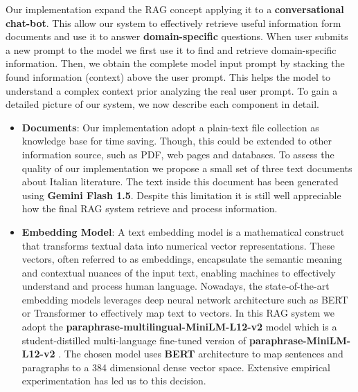 \documentclass{article}
\begin{document}
	Our implementation expand the RAG concept applying it to a \textbf{conversational chat-bot}. This allow our system to effectively retrieve useful information form documents and use it to answer \textbf{domain-specific} questions. 
	When user submits a new prompt to the model we first use it to find and retrieve domain-specific information. Then, we obtain the complete model input prompt by stacking the found information (context) above the user prompt.
	This helps the model to understand a complex context prior analyzing the real user prompt.
	To gain a detailed picture of our system, we now describe each component in detail.
	
	\begin{itemize}
		\item \textbf{Documents}: Our implementation adopt a plain-text file collection as knowledge base for time saving. Though, this could be extended to other information source, such as PDF, web pages and databases. To assess the quality of our implementation we propose a small set of three text documents about Italian literature. The text inside this document has been generated using \textbf{Gemini Flash 1.5}. Despite this limitation it is still well appreciable how the final RAG system retrieve and process information.  
		
		\item \textbf{Embedding Model}: A text embedding model is a mathematical construct that transforms textual data into numerical vector representations. These vectors, often referred to as embeddings, encapsulate the semantic meaning and contextual nuances of the input text, enabling machines to effectively understand and process human language. Nowadays, the state-of-the-art embedding models leverages deep neural network architecture such as BERT \cite{devlin2019bertpretrainingdeepbidirectional} or Transformer \cite{vaswani2023attentionneed} to effectively map text to vectors.
		In this RAG system we adopt the \textbf{paraphrase-multilingual-MiniLM-L12-v2} model which is a student-distilled multi-language fine-tuned version of \textbf{paraphrase-MiniLM-L12-v2} \cite{wang2020minilmdeepselfattentiondistillation}.
		The chosen model uses \textbf{BERT} architecture to map sentences and paragraphs to a 384 dimensional dense vector space. Extensive empirical experimentation has led us to this decision. 
		

\end{itemize}
\end{document}

